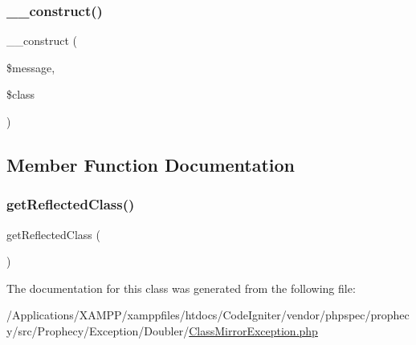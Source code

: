 \subsubsection{\texorpdfstring{\+\_\+\+\_\+construct()}{\_\_construct()}}
{\footnotesize\ttfamily \+\_\+\+\_\+construct (\begin{DoxyParamCaption}\item[{}]{\$message,  }\item[{Reflection\+Class}]{\$class }\end{DoxyParamCaption})}



\subsection{Member Function Documentation}
\mbox{\label{class_prophecy_1_1_exception_1_1_doubler_1_1_class_mirror_exception_a76c6b8e0d0587534918cb7faa5765437}} 
\subsubsection{\texorpdfstring{get\+Reflected\+Class()}{getReflectedClass()}}
{\footnotesize\ttfamily get\+Reflected\+Class (\begin{DoxyParamCaption}{ }\end{DoxyParamCaption})}



The documentation for this class was generated from the following file\+:\begin{DoxyCompactItemize}
\item 
/\+Applications/\+X\+A\+M\+P\+P/xamppfiles/htdocs/\+Code\+Igniter/vendor/phpspec/prophecy/src/\+Prophecy/\+Exception/\+Doubler/\mbox{\hyperlink{_class_mirror_exception_8php}{Class\+Mirror\+Exception.\+php}}\end{DoxyCompactItemize}
